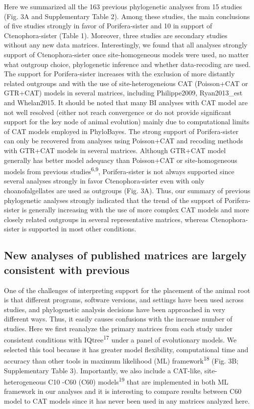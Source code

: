 \documentclass[]{article}
\begin{document}
Here we summarized all the 163 previous phylogenetic analyses from 15
studies (Fig. 3A and Supplementary Table 2). Among these studies, the
main conclusions of five studies strongly in favor of Porifera-sister
and 10 in support of Ctenophora-sister (Table 1). Moreover, three
studies are secondary studies without any new data matrices.
Interestingly, we found that all analyses strongly support of
Ctenophora-sister once site-homogeneous models were used, no matter what
outgroup choice, phylogenetic inference and whether data-recoding are
used. The support for Porifera-sister increases with the exclusion of
more distantly related outgroups and with the use of site-heterogeneious
CAT (Poisson+CAT or GTR+CAT) models in several matrices, including
Philippe2009, Ryan2013\_est and Whelan2015. It should be noted that many
BI analyses with CAT model are not well resolved (either not reach
convergence or do not provide significant support for the key node of
animal evolution) mainly due to computational limits of CAT models
employed in PhyloBayes. The strong support of Porifera-sister can only
be recovered from analyses using Poisson+CAT and recoding methods with
GTR+CAT models in several matrices. Although GTR+CAT model generally has
better model adequacy than Poisson+CAT or site-homogeneous models from
previous studies\textsuperscript{6,9}, Porifera-sister is not always
supported since several analyses strongly in favor Ctenophora-sister
even with only choanofalgellates are used as outgroups (Fig. 3A). Thus,
our summary of previous phylogenetic analyses strongly indicated that
the trend of the support of Porifera-sister is generally increasing with
the use of more complex CAT models and more closely related outgroups in
several representative matrices, whereas Ctenophora-sister is supported
in most other conditions.

\hypertarget{new-analyses-of-published-matrices-are-largely-consistent-with-previous}{%
\subsection{New analyses of published matrices are largely consistent
with
previous}\label{new-analyses-of-published-matrices-are-largely-consistent-with-previous}}

One of the challenges of interpreting support for the placement of the
animal root is that different programs, software versions, and settings
have been used across studies, and phylogenetic analysis decisions have
been approached in very different ways. Thus, it easily causes
confusions with the increase number of studies. Here we first reanalyze
the primary matrices from each study under consistent conditions with
IQtree\textsuperscript{17} under a panel of evolutionary models. We
selected this tool because it has greater model flexibility,
computational time and accuracy than other tools in maximum likelihood
(ML) framework\textsuperscript{18} (Fig. 3B; Supplementary Table 3).
Importantly, we also include a CAT-like, site-heterogeneous C10 -C60
(C60) models\textsuperscript{19} that are implemented in both ML
framework in our analyses and it is interesting to compare results
between C60 model to CAT models since it has never been used in any
matrices analyzed here.
\end{document}
